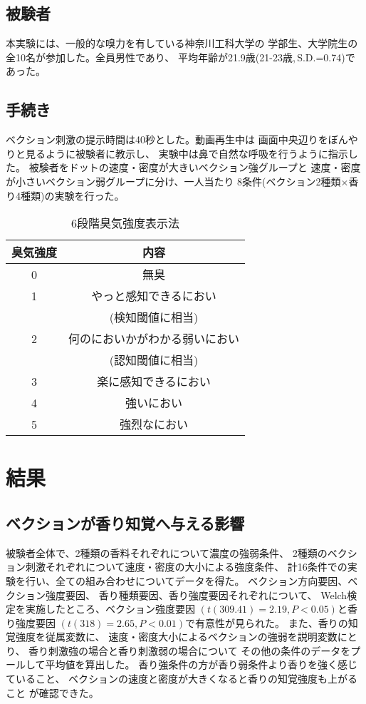 \documentclass[uplatex]{jsarticle}   %
\begin{document}
\subsection{被験者}
本実験には、一般的な嗅力を有している神奈川工科大学の
学部生、大学院生の全10名が参加した。全員男性であり、
平均年齢が21.9歳(21-23歳,\,S.D.=0.74)であった。

\subsection{手続き}
ベクション刺激の提示時間は40秒とした。動画再生中は
画面中央辺りをぼんやりと見るように被験者に教示し、
実験中は鼻で自然な呼吸を行うように指示した。
被験者をドットの速度・密度が大きいベクション強グループと
速度・密度が小さいベクション弱グループに分け、一人当たり
8条件(ベクション2種類×香り4種類)の実験を行った。

\begin{table}[htbp]
    \centering
    \caption{6段階臭気強度表示法}
    \begin{tabular}{|c|c|}\hline
     臭気強度 & 内容 \\ \hline
     0 & 無臭 \\ \hline
     1 & やっと感知できるにおい\\
     & (検知閾値に相当)\\ \hline
     2 & 何のにおいかがわかる弱いにおい \\
     & (認知閾値に相当)\\ \hline
     3 & 楽に感知できるにおい \\ \hline
     4 & 強いにおい \\ \hline
     5 & 強烈なにおい \\ \hline
    \end{tabular}
\end{table}

\section{結果}
\subsection{ベクションが香り知覚へ与える影響}
被験者全体で、2種類の香料それぞれについて濃度の強弱条件、
2種類のベクション刺激それぞれについて速度・密度の大小による強度条件、
計16条件での実験を行い、全ての組み合わせについてデータを得た。
ベクション方向要因、ベクション強度要因、
香り種類要因、香り強度要因それぞれについて、
Welch検定を実施したところ、ベクション強度要因
$(t(309.41)=2.19, P < 0.05)$と香り強度要因
$(t(318)=2.65, P < 0.01)$で有意性が見られた。
また、香りの知覚強度を従属変数に、
速度・密度大小によるベクションの強弱を説明変数にとり、
香り刺激強の場合と香り刺激弱の場合について
その他の条件のデータをプールして平均値を算出した。
香り強条件の方が香り弱条件より香りを強く感じていること、
ベクションの速度と密度が大きくなると香りの知覚強度も上がること
が確認できた。
\end{document}
